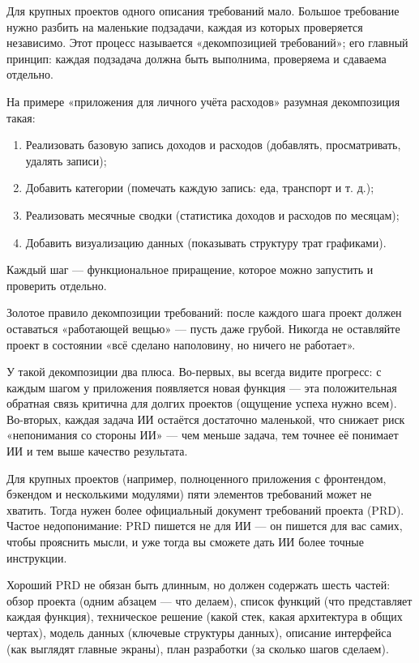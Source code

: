 
Для крупных проектов одного описания требований мало. Большое требование нужно разбить на маленькие подзадачи, каждая из которых проверяется независимо. Этот процесс называется «декомпозицией требований»; его главный принцип: каждая подзадача должна быть выполнима, проверяема и сдаваема отдельно.

На примере «приложения для личного учёта расходов» разумная декомпозиция такая:

\begin{enumerate}
  \item Реализовать базовую запись доходов и расходов (добавлять, просматривать, удалять записи);
  \item Добавить категории (помечать каждую запись: еда, транспорт и т. д.);
  \item Реализовать месячные сводки (статистика доходов и расходов по месяцам);
  \item Добавить визуализацию данных (показывать структуру трат графиками).
\end{enumerate}

Каждый шаг — функциональное приращение, которое можно запустить и проверить отдельно.

Золотое правило декомпозиции требований: после каждого шага проект должен оставаться «работающей вещью» — пусть даже грубой. Никогда не оставляйте проект в состоянии «всё сделано наполовину, но ничего не работает».

У такой декомпозиции два плюса. Во-первых, вы всегда видите прогресс: с каждым шагом у приложения появляется новая функция — эта положительная обратная связь критична для долгих проектов (ощущение успеха нужно всем). Во-вторых, каждая задача ИИ остаётся достаточно маленькой, что снижает риск «непонимания со стороны ИИ» — чем меньше задача, тем точнее её понимает ИИ и тем выше качество результата.


Для крупных проектов (например, полноценного приложения с фронтендом, бэкендом и несколькими модулями) пяти элементов требований может не хватить. Тогда нужен более официальный документ требований проекта (PRD). Частое недопонимание: PRD пишется не для ИИ — он пишется для вас самих, чтобы прояснить мысли, и уже тогда вы сможете дать ИИ более точные инструкции.

Хороший PRD не обязан быть длинным, но должен содержать шесть частей: обзор проекта (одним абзацем — что делаем), список функций (что представляет каждая функция), техническое решение (какой стек, какая архитектура в общих чертах), модель данных (ключевые структуры данных), описание интерфейса (как выглядят главные экраны), план разработки (за сколько шагов сделаем).

